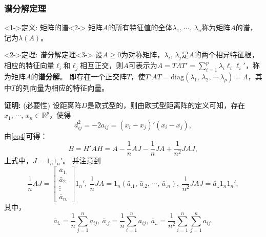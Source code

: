 \documentclass[UTF8, compress]{ctexbeamer}
\begin{document}
	\begin{frame}
	\frametitle{\heiti 谱分解定理}
	
	
		\begin{block}<1->{\heiti 定义: 矩阵的谱}<2->
			矩阵$A$的所有特征值的全体$\lambda_1,\,\cdots,\,\lambda_n$称为矩阵$A$的谱，记为$\lambda(A)$。
		\end{block}

		\vspace{.5cm}

		\begin{block}<2->{\heiti 定理: 谱分解定理}<3->
			设$\!A\geqslant0\!$为对称矩阵，$\!\lambda_i,\,\lambda_j\!$是$A$的两个相异特征根，相应的特征向量$\ell_i$和$\ell_j$相互正交，则$\!A\!$可表示为$\!A=T\Lambda T'=\sum\limits_{i=1}^p\lambda_i\ell_i\ell_i'$，称为矩阵$\!A\!$的\textbf{谱分解}。
			\pause
			即存在一个正交阵$T$，使$T'AT=\mathrm{diag}(\lambda_1,\,\lambda_2,\,\cdots\,\lambda_p)=\Lambda$，其中$T$的列向量为相应的特征向量。
		\end{block}
	\end{frame}

	\begin{frame}
		\textbf{\heiti 证明:}	
		\pause
			(必要性) 设距离阵$D$是欧式型的，则由欧式型距离阵的定义可知，存在$x_1,\,\cdots,\,x_n\in\mathbb{R}^p$，使得
			\begin{equation}
			\label{eq5}
			d_{ij}^2=-2a_{ij}=(x_i-x_j)'(x_i-x_j),
			\end{equation}
		\pause
			由\eqref{eq4}可得：
			\begin{equation}
			\label{eq6}
			B=H'AH=A-\dfrac1nAJ-\dfrac1nJA+\dfrac1{n^2}JAJ,
			\end{equation}
			上式中，$J=1_n1_n'$。
		\pause		
			并注意到
			\begin{equation}
			\dfrac1nAJ=\begin{bmatrix}
			\bar{a}_{1.}\\
			\bar{a}_{2.}\\
			\vdots\\
			\bar{a}_{n.}
			\end{bmatrix}
			1_n',\ 
			\dfrac1nJA=1_n(\bar{a}_{.1},\,\bar{a}_{.2},\,\cdots,\,\bar{a}_{.n}),\ 
			\dfrac1{n^2}JAJ=\bar{a}_{..}1_n1_n',
			\end{equation}			
		\pause			
			其中，
			\begin{equation}
			\bar{a}_{i.}=\dfrac1n\sum\limits_{j=1}^na_{ij},\ 
			\bar{a}_{.j}=\dfrac1n\sum\limits_{i=1}^na_{ij},\ 
			\bar{a}_{..}=\dfrac1{n^2}\sum\limits_{i=1}^n\sum\limits_{j=1}^na_{ij}.
			\end{equation}
	
	\end{frame}
\end{document}
